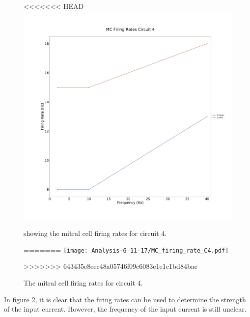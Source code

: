 \documentclass[11pt]{report}
\begin{document}
\begin{figure}[!ht]
\centering
<<<<<<< HEAD
\includegraphics[scale=0.3]{images/2017-11-06/MC_firing_rate_C4.pdf}
\caption{showing the mitral cell firing rates for circuit 4.}
=======
\texttt{[image: Analysis-6-11-17/MC\_firing\_rate\_C4.pdf]}
\caption{The mitral cell firing rates for circuit 4.}
>>>>>>> 643435e8cec48a05746f09c6083e1e1c1bd84bae
\end{figure} 

In figure 2, it is clear that the firing rates can be used to determine the strength of the input current. However, the frequency of the input current is still unclear. 
\newpage
\end{document}
